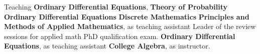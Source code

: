 \begin{rubric}{Teaching}
\entry*[2022 Spring]%
       \textbf{Ordinary Differential Equations}, 
\entry*[2022 Fall]%
       \textbf{Theory of Probability}
\entry*[2022 Spring]%
       \textbf{Ordinary Differential Equations}
\entry*[2021 Fall]%
        \textbf{Discrete Mathematics}
% 
        \textbf{Principles and Methods of Applied Mathematics}, as teaching assistant
\entry*[2018 Summer] 
        Leader of the review sessions for applied math PhD qualification exam.%
% 
        \textbf{Ordinary Differential Equations}, as teaching assistant
% 
        \textbf{College Algebra}, as instructor.
\end{rubric}
